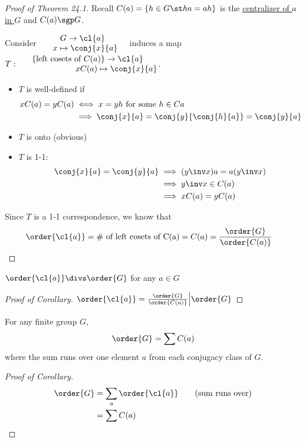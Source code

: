 \begin{proof}[Proof of Theorem 24.1]
Recall \(C(a) = \{h\in G \st ha=ah\}\) is the \ul{centralizer of \(a\) in \(G\)} and \(C(a)\sgp G\).

Consider \( \quad\begin{matrix}
    G\to \cl{a} \\
    \ \ x\mapsto \conj{x}{a}
\end{matrix}\quad \) induces a map \(T:\begin{matrix}
    \{\text{left cosets of } C(a)\} \to \cl{a} \\
    \qquad \qquad \qquad \quad xC(a) \mapsto \conj{x}{a}
\end{matrix}\).

\begin{itemize}
    \item \(T\) is well-defined if \begin{align*}
        xC(a) = yC(a) &\iff x=yh \text{ for some } h\in C{a} \\
            &\implies \conj{x}{a} = \conj{y}{\conj{h}{a}} = \conj{y}{a}
    \end{align*}
    \item \(T\) is onto (obvious)
    \item \(T\) is 1-1: \begin{align*}
        \conj{x}{a} = \conj{y}{a} &\implies (y\inv x)a = a(y\inv x) \\
        &\implies y\inv x \in C(a) \\
        &\implies xC(a) = yC(a)
    \end{align*}
\end{itemize}
Since \(T\) is a 1-1 correspondence, we know that \begin{align*}
    \order{\cl{a}} &= \text{\# of left cosets of C(a)} = \index{G}{C(a)} = \frac{\order{G}}{\order{C(a)}}
\end{align*}
\end{proof}

\begin{corollary}
  \(\order{\cl{a}}\divs \order{G}\) for any \(a\in G\)
\end{corollary}

\begin{proof}[Proof of Corollary]
    \(\order{\cl{a}} = \frac{\order{G}}{\order{C(a)}} \Big\vert \order{G}\)
\end{proof}

\begin{corollary}
  For any finite group \(G\), \begin{align*}
    \order{G} = \sum \index{G}{C(a)}
  \end{align*}
  where the sum runs over one element \(a\) from each conjugacy class of \(G\).
\end{corollary}
\begin{proof}[Proof of Corollary]
    \begin{align*}
        \order{G} &= \sum_a \order{\cl{a}}\qquad\text{(sum runs over)} \\
        &= \sum \index{G}{C(a)}
    \end{align*}
\end{proof}

